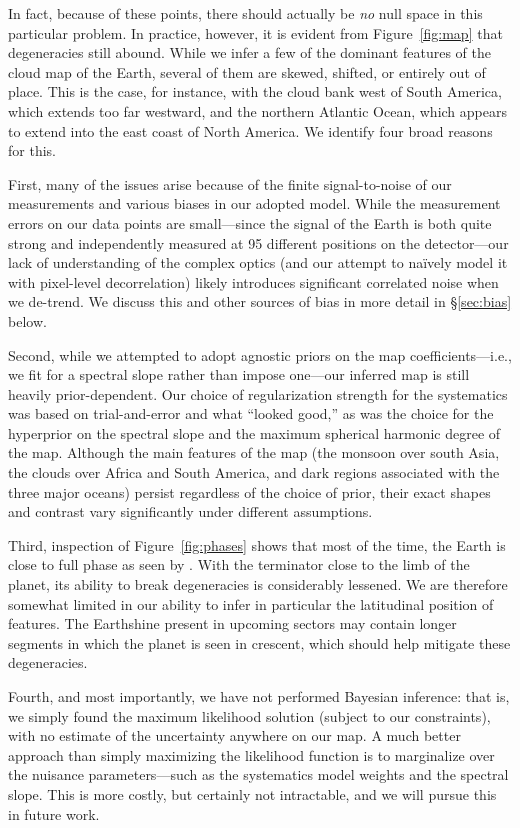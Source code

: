 \documentclass[modern]{aastex62}
\begin{document}
In fact, because of these points, there should actually be \emph{no} null space 
in this particular problem. In practice, however, it is evident from
Figure~\ref{fig:map} that degeneracies still abound. While we infer a few of the
dominant features of the cloud map of the Earth, several of them are skewed, 
shifted, or entirely out of place. This is the case, for instance, with
the cloud bank west of South America, which extends too far westward, and
the northern Atlantic Ocean, which appears to extend into the east coast of
North America. We identify four broad reasons for this.

First, many of the issues arise because
of the finite signal-to-noise of our measurements and various biases in
our adopted model. While the measurement errors on our data points are 
small---since the signal of the Earth is both quite strong and independently
measured at 95 different positions on the detector---our lack of understanding
of the complex optics (and our
attempt to na{\"i}vely model it with pixel-level decorrelation) likely
introduces significant correlated noise when we de-trend. We discuss this
and other sources of bias in more detail in \S\ref{sec:bias} below.

Second, while we attempted to adopt agnostic priors on the map coefficients---i.e.,
we fit for a spectral slope rather than impose one---our inferred map is still 
heavily prior-dependent. Our choice of regularization strength for the systematics
was based on trial-and-error and what ``looked good,'' as was the choice for the 
hyperprior on the spectral
slope and the maximum spherical harmonic degree of the map. Although the main
features of the map (the monsoon over south Asia, the clouds over Africa and
South America, and dark regions associated with the three major oceans) persist
regardless of the choice of prior, their exact shapes and contrast vary
significantly under different assumptions.

Third, inspection of Figure~\ref{fig:phases} shows that most of the time, the Earth
is close to full phase as seen by \TESS.
With the terminator close to the limb
of the planet, its ability to break degeneracies is considerably lessened.
We are therefore somewhat limited in our ability to infer in particular the
latitudinal position of features. The Earthshine present in upcoming
sectors may contain longer segments in which the planet is seen in crescent,
which should help mitigate these degeneracies.

Fourth, and most importantly, we have not performed Bayesian inference: that is, 
we simply found the maximum likelihood solution (subject to our constraints),
with no estimate of the uncertainty anywhere on our map. A much better
approach than simply maximizing the likelihood function is to marginalize
over the nuisance parameters---such as the systematics model weights and the spectral
slope. This is more costly, but certainly not intractable, and we will
pursue this in future work.
\end{document}
